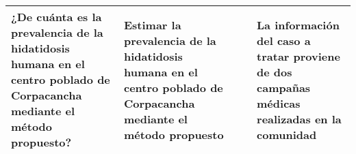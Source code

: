 \begin{landscape}
\begin{table}[htbp]
\begin{tabular}{|p{11.07em}|p{11.07em}|r|r|p{11.07em}|}
    ¿De cuánta es la prevalencia de la hidatidosis humana en el centro poblado de Corpacancha mediante el método propuesto? & Estimar la prevalencia de la hidatidosis humana en el centro poblado de Corpacancha mediante el método propuesto &       &       & La información del caso a tratar proviene de dos campañas médicas realizadas en la comunidad \\
    \bottomrule
    \end{tabular}%
  \label{tab:addlabel}%
  
\end{table}%

\end{landscape}

